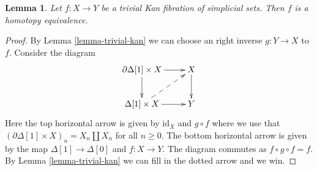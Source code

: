 \documentclass{stacks-project}
\theoremstyle{plain}
\newtheorem{lemma}[subsection]{Lemma}
\theoremstyle{definition}
\theoremstyle{remark}
\numberwithin{equation}{subsection}
\begin{document}
\begin{lemma}
\label{lemma-trivial-kan-homotopy}
Let $f : X \to Y$ be a trivial Kan fibration of simplicial sets.
Then $f$ is a homotopy equivalence.
\end{lemma}

\begin{proof}
By Lemma \ref{lemma-trivial-kan} we can choose an right inverse $g : Y \to X$
to $f$. Consider the diagram
$$
\xymatrix{
\partial \Delta[1] \times X \ar[d] \ar[r] & X \ar[d] \\
\Delta[1] \times X \ar[r] \ar@{-->}[ru] & Y
}
$$
Here the top horizontal arrow is given by $\text{id}_X$ and $g \circ f$
where we use that
$(\partial \Delta[1] \times X)_n = X_n \amalg X_n$ for all $n \geq 0$.
The bottom horizontal arrow is given by the map $\Delta[1] \to \Delta[0]$
and $f : X \to Y$. The diagram commutes as $f \circ g \circ f = f$.
By Lemma \ref{lemma-trivial-kan} we can fill in the dotted arrow
and we win.
\end{proof}
\end{document}
